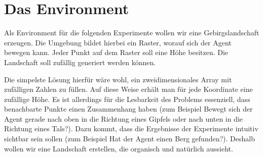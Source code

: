 \section{Das Environment}

Als Environment für die folgenden Experimente wollen wir eine Gebirgslandschaft erzeugen. Die Umgebung bildet hierbei ein Raster, worauf sich der Agent bewegen kann. Jeder Punkt auf dem Raster soll eine Höhe besitzen. Die Landschaft soll zufällig generiert werden können.

Die simpelste Lösung hierfür wäre wohl, ein zweidimensionales Array mit zufälligen Zahlen zu füllen. Auf diese Weise erhält man für jede Koordinate eine zufällige Höhe. Es ist allerdings für die Lesbarkeit des Problems essenziell, dass benachbarte Punkte einen Zusammenhang haben (zum Beispiel \glqq Bewegt sich der Agent gerade nach oben in die Richtung eines Gipfels oder nach unten in die Richtung eines Tals?\grqq). Dazu kommt, dass die Ergebnisse der Experimente intuitiv sichtbar sein sollen (zum Beispiel \glqq Hat der Agent einen Berg gefunden?\grqq). Deshalb wollen wir eine Landschaft erstellen, die organisch und natürlich aussieht.

